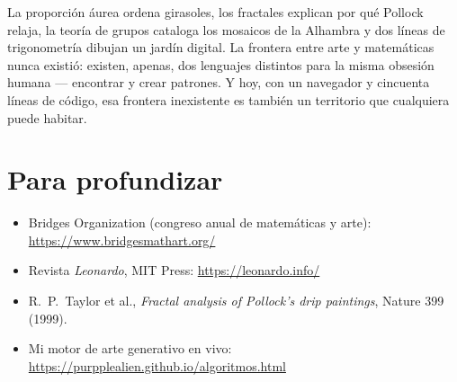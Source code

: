\documentclass[11pt]{article}
\begin{document}
La proporción áurea ordena girasoles, los fractales explican por qué Pollock relaja, la teoría
de grupos cataloga los mosaicos de la Alhambra y dos líneas de trigonometría dibujan un jardín
digital. La frontera entre arte y matemáticas nunca existió: existen, apenas, dos lenguajes
distintos para la misma obsesión humana --- encontrar y crear patrones. Y hoy, con un
navegador y cincuenta líneas de código, esa frontera inexistente es también un territorio
que cualquiera puede habitar.

\section*{Para profundizar}

\begin{itemize}
  \item Bridges Organization (congreso anual de matemáticas y arte): \url{https://www.bridgesmathart.org/}
  \item Revista \emph{Leonardo}, MIT Press: \url{https://leonardo.info/}
  \item R.~P.~Taylor et al., \emph{Fractal analysis of Pollock's drip paintings}, Nature 399 (1999).
  \item Mi motor de arte generativo en vivo: \url{https://purpplealien.github.io/algoritmos.html}
\end{itemize}
\end{document}
